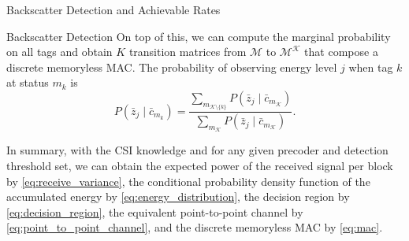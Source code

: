\documentclass[journal]{IEEEtran}
\begin{document}
\begin{section}{Backscatter Detection and Achievable Rates}
\begin{subsection}{Backscatter Detection}
			On top of this, we can compute the marginal probability on all tags and obtain $K$ transition matrices from $\mathcal{M}$ to $\mathcal{M^K}$ that compose a discrete memoryless MAC. The probability of observing energy level $j$ when tag $k$ at status $m_k$ is
			\begin{equation}
				P(\bar{z}_j \mid \bar{c}_{m_k}) = \frac{\sum_{m_{\mathcal{K} \setminus \{k\}}} P(\bar{z}_j \mid \bar{c}_{m_{\mathcal{K}}})}{\sum_{m_{\mathcal{K}}} P(\bar{z}_j \mid \bar{c}_{m_{\mathcal{K}}})}.
				\label{eq:mac}
			\end{equation}

			In summary, with the CSI knowledge and for any given precoder and detection threshold set, we can obtain the expected power of the received signal per block by \eqref{eq:receive_variance}, the conditional probability density function of the accumulated energy by \eqref{eq:energy_distribution}, the decision region by \eqref{eq:decision_region}, the equivalent point-to-point channel by \eqref{eq:point_to_point_channel}, and the discrete memoryless MAC by \eqref{eq:mac}.
		\end{subsection}


\end{section}
\end{document}
